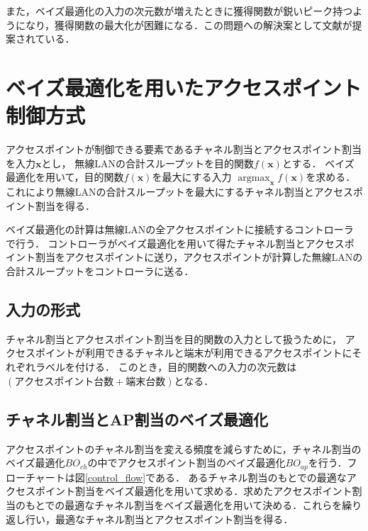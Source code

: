 \documentclass[a4paper,11pt]{jarticle}
\DeclareMathOperator*{\argmax}{argmax}
\begin{document}
また，ベイズ最適化の入力の次元数が増えたときに獲得関数が鋭いピーク持つようになり，獲得関数の最大化が困難になる．この問題への解決案として文献\cite{pmlr-v70-rana17a}が提案されている．

\section{ベイズ最適化を用いたアクセスポイント制御方式}
アクセスポイントが制御できる要素であるチャネル割当とアクセスポイント割当を入力$\mathbf{x}$とし，
無線LANの合計スループットを目的関数$f(\mathbf{x})$とする．
ベイズ最適化を用いて，目的関数$f(\mathbf{x})$を最大にする入力
$\argmax_{\mathbf{x}} f(\mathbf{x})$を求める．
これにより無線LANの合計スループットを最大にするチャネル割当とアクセスポイント割当を得る．

ベイズ最適化の計算は無線LANの全アクセスポイントに接続するコントローラで行う．
コントローラがベイズ最適化を用いて得たチャネル割当とアクセスポイント割当をアクセスポイントに送り，アクセスポイントが計算した無線LANの合計スループットをコントローラに送る．

\subsection{入力の形式}
チャネル割当とアクセスポイント割当を目的関数の入力として扱うために，
アクセスポイントが利用できるチャネルと端末が利用できるアクセスポイントにそれぞれラベルを付ける．
このとき，目的関数への入力の次元数は$(アクセスポイント台数+端末台数)$となる．


\subsection{チャネル割当とAP割当のベイズ最適化}
アクセスポイントのチャネル割当を変える頻度を減らすために，チャネル割当のベイズ最適化$BO_{ch}$の中でアクセスポイント割当のベイズ最適化$BO_{ap}$を行う．フローチャートは図\ref{control_flow}である．
あるチャネル割当のもとでの最適なアクセスポイント割当をベイズ最適化を用いて求める．求めたアクセスポイント割当のもとでの最適なチャネル割当をベイズ最適化を用いて決める．これらを繰り返し行い，最適なチャネル割当とアクセスポイント割当を得る．
\end{document}
